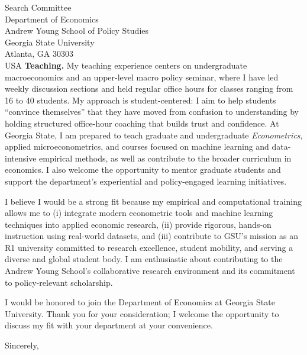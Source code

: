 \documentclass[11pt,letterpaper]{letter}
\begin{document}
\begin{letter}{Search Committee \\
Department of Economics \\
Andrew Young School of Policy Studies \\
Georgia State University \\
Atlanta, GA 30303 \\ USA}
\textbf{Teaching.} My teaching experience centers on undergraduate macroeconomics and an upper-level macro policy seminar, where I have led weekly discussion sections and held regular office hours for classes ranging from 16 to 40 students. My approach is student-centered: I aim to help students “convince themselves” that they have moved from confusion to understanding by holding structured office-hour coaching that builds trust and confidence. At Georgia State, I am prepared to teach graduate and undergraduate \textit{Econometrics}, applied microeconometrics, and courses focused on machine learning and data-intensive empirical methods, as well as contribute to the broader curriculum in economics. I also welcome the opportunity to mentor graduate students and support the department’s experiential and policy-engaged learning initiatives.

I believe I would be a strong fit because my empirical and computational training allows me to (i) integrate modern econometric tools and machine learning techniques into applied economic research, (ii) provide rigorous, hands-on instruction using real-world datasets, and (iii) contribute to GSU’s mission as an R1 university committed to research excellence, student mobility, and serving a diverse and global student body. I am enthusiastic about contributing to the Andrew Young School’s collaborative research environment and its commitment to policy-relevant scholarship.

I would be honored to join the Department of Economics at Georgia State University. Thank you for your consideration; I welcome the opportunity to discuss my fit with your department at your convenience.

\closing{Sincerely,}

\end{letter}
\end{document}
